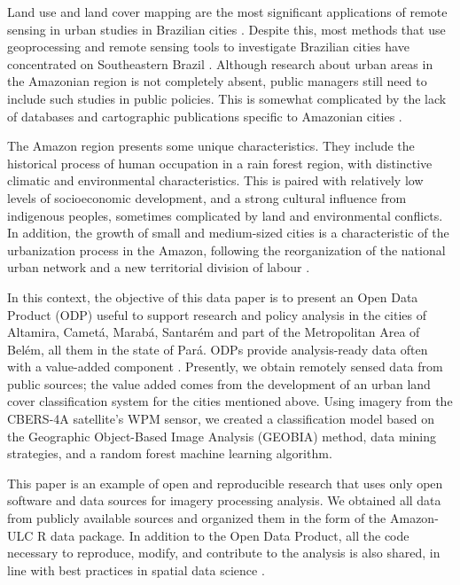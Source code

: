 \documentclass[preprint, 3p,
authoryear]{elsarticle} %
\begin{document}
Land use and land cover mapping are the most significant applications of
remote sensing in urban studies in Brazilian cities \citep{Almeida2010}.
Despite this, most methods that use geoprocessing and remote sensing
tools to investigate Brazilian cities have concentrated on Southeastern
Brazil \citep{Santos2022}. Although research about urban areas in the
Amazonian region is not completely absent, public managers still need to
include such studies in public policies. This is somewhat complicated by
the lack of databases and cartographic publications specific to
Amazonian cities \citep{Cardoso2020}.

The Amazon region presents some unique characteristics. They include the
historical process of human occupation in a rain forest region, with
distinctive climatic and environmental characteristics. This is paired
with relatively low levels of socioeconomic development, and a strong
cultural influence from indigenous peoples, sometimes complicated by
land and environmental conflicts. In addition, the growth of small and
medium-sized cities is a characteristic of the urbanization process in
the Amazon, following the reorganization of the national urban network
and a new territorial division of labour
\citep{Trindade1998, Trindade2011}.

In this context, the objective of this data paper is to present an Open
Data Product (ODP) useful to support research and policy analysis in the
cities of Altamira, Cametá, Marabá, Santarém and part of the
Metropolitan Area of Belém, all them in the state of Pará. ODPs provide
analysis-ready data often with a value-added component
\citep[see][]{arribas2021open}. Presently, we obtain remotely sensed
data from public sources; the value added comes from the development of
an urban land cover classification system for the cities mentioned
above. Using imagery from the CBERS-4A satellite's WPM sensor, we
created a classification model based on the Geographic Object-Based
Image Analysis (GEOBIA) method, data mining strategies, and a random
forest machine learning algorithm.

This paper is an example of open and reproducible research that uses
only open software and data sources for imagery processing analysis. We
obtained all data from publicly available sources and organized them in
the form of the Amazon-ULC R data package. In addition to the Open Data
Product, all the code necessary to reproduce, modify, and contribute to
the analysis is also shared, in line with best practices in spatial data
science \citep{brunsdon2021opening, DESJARDINS2022103091}.
\end{document}

